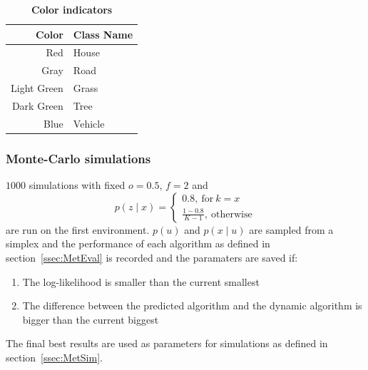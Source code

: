 \documentclass[twocolumn,letterpaper]{IEEEAerospaceCLS}  %
\begin{document}
\begin{table}[]
    \renewcommand{\arraystretch}{1.3}
    \caption{\bf Color indicators}
    \label{tab:colors}
    \centering
    \begin{tabular}{|r||l|}
        \hline
        \bfseries Color      & \bfseries Class Name    \\
        \hline \hline
        Red &  House\\
        \hline
        Gray  & Road         \\
        \hline
        Light Green     & Grass              \\
        \hline
        Dark Green & Tree           \\
        \hline
        Blue & Vehicle \\
        \hline
    \end{tabular}
\end{table}

\subsubsection{Monte-Carlo simulations} \label{ssec:MetMC}
$1000$ simulations with fixed $o=0.5$, $f=2$ and
\begin{equation}
    p(z\mid x)=
    \begin{cases}
        0.8,~\text{for}~k=x \\
        \frac{1-0.8}{K-1},~\text{otherwise}
    \end{cases}
\end{equation}
are run on the first environment. $p(u)$ and $p(x\mid u)$ are sampled from a simplex and the performance of each algorithm as defined in section~\ref{ssec:MetEval} is recorded and the paramaters are saved if:
\begin{enumerate}
    \item The log-likelihood is smaller than the current smallest
    \item The difference between the predicted algorithm and the dynamic algorithm is bigger than the current biggest
\end{enumerate}
The final best results are used as parameters for simulations as defined in section~\ref{ssec:MetSim}.
\end{document}
